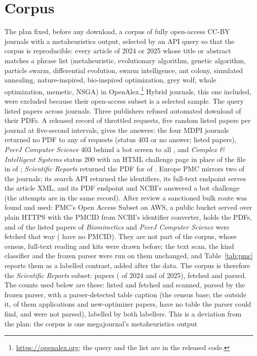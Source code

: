 \documentclass[preprint,review,12pt]{elsarticle}
\begin{document}
\section{Corpus}
\label{sec:corpus}

The plan fixed, before any download, a corpus of fully open-access CC-BY journals with a metaheuristics output, selected by an API query so that the corpus is reproducible: every article of 2024 or 2025 whose title or abstract matches a phrase list (metaheuristic, evolutionary algorithm, genetic algorithm, particle swarm, differential evolution, swarm intelligence, ant colony, simulated annealing, nature-inspired, bio-inspired optimization, grey wolf, whale optimization, memetic, NSGA) in OpenAlex.\footnote{\url{https://openalex.org}; the query and the list are in the released code.} Hybrid journals, this one included, were excluded because their open-access subset is a selected sample. The query listed \nOListed{} papers across \nOJournalsListed{} journals. Three publishers refused automated download of their PDFs. A released record of throttled requests, five random listed papers per journal at five-second intervals, gives the answers: the four MDPI journals returned no PDF to any of \nFaMdpiAttempts{} requests (status 403 or no answer; \nFaMdpiListed{} listed papers), \emph{PeerJ Computer Science} 403 behind a bot screen to all \nFaPeerjComputerScienceAttempts{}, and \emph{Complex \& Intelligent Systems} status 200 with an HTML challenge page in place of the file in \nFaComplexAndIntelligentSystemsHtmlOnly{} of \nFaComplexAndIntelligentSystemsAttempts{}; \emph{Scientific Reports} returned the PDF for \nFaScientificReportsPdfOk{} of \nFaScientificReportsAttempts{}. Europe PMC mirrors two of the journals; its search API returned the identifiers, its full-text endpoint serves the article XML, and its PDF endpoint and NCBI's answered a bot challenge (the attempts are in the same record). After review a sanctioned bulk route was found and used: PMC's Open Access Subset on AWS, a public bucket served over plain HTTPS with the PMCID from NCBI's identifier converter, holds the PDFs, and \nPmFetchOk{} of the \nPmFetchListed{} listed papers of \emph{Biomimetics} and \emph{PeerJ Computer Science} were fetched that way (\nPmFetchNoPmcid{} have no PMCID). They are not part of the corpus, whose census, full-text reading and kits were drawn before; the text scan, the kind classifier and the frozen parser were run on them unchanged, and Table~\ref{tab:pmc} reports them as a labelled contrast, added after the data. The corpus is therefore the \emph{Scientific Reports} subset: \nOListedSrep{} papers (\nOListedSrepTwentyFour{} of 2024 and \nOListedSrepTwentyFive{} of 2025), \nOFetched{} fetched and \nOParsed{} parsed. The counts used below are these: \nOListedSrep{} listed and fetched and scanned, \nOParsed{} parsed by the frozen parser, \nCzPapersEligible{} with a parser-detected table caption (the census base; the \nCzExcludedPapers{} outside it, \nCzExcludedApplication{} of them applications and \nCzExcludedNewOptimizer{} new-optimizer papers, have no table the parser could find, and \nCzExcludedNotParsed{} were not parsed), \nKafPapers{} labelled by both labellers. This is a deviation from the plan: the corpus is one megajournal's metaheuristics output 
\end{document}
